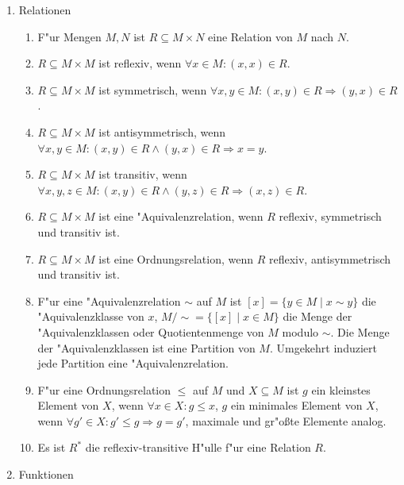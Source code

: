 \begin{enumerate}
\begin{enumerate}
    \item DeMorgan: $A\setminus (B\cup C) \Leftrightarrow (A\setminus B) \cap (A\setminus C)$
    \item DeMorgan: $A\setminus (B\cap C) \Leftrightarrow (A\setminus B) \cup (A\setminus C)$
    \item Es ist $\bigcup_{i\in I}A_i = \{x\mid \exists i\in I: x\in A_i\}$.
    \item Es ist $\bigcap_{i\in I}A_i = \{x\mid\forall i\in I: x\in A_i\}$.
\end{enumerate}
\item Relationen
\begin{enumerate}
    \item F"ur Mengen $M,N$ ist $R\subseteq M\times N$ eine Relation von $M$ nach $N$.
    \item $R\subseteq M\times M$ ist reflexiv, wenn $\forall x\in M: (x,x)\in R$.
    \item $R\subseteq M\times M$ ist symmetrisch, wenn $\forall x,y\in M: (x,y)\in R \Rightarrow (y,x)\in R$.
    \item $R\subseteq M\times M$ ist antisymmetrisch, wenn $\forall x,y\in M: (x,y)\in R \wedge (y,x)\in R \Rightarrow x=y$.
    \item $R\subseteq M\times M$ ist transitiv, wenn $\forall x,y,z\in M: (x,y)\in R \wedge (y,z)\in R \Rightarrow (x,z)\in R$.
    \item $R\subseteq M\times M$ ist eine "Aquivalenzrelation, wenn $R$ reflexiv, symmetrisch und transitiv ist.
    \item $R\subseteq M\times M$ ist eine Ordnungsrelation, wenn $R$ reflexiv, antisymmetrisch und transitiv ist.
    \item F"ur eine "Aquivalenzrelation $\sim$ auf $M$ ist $[x]=\{y\in M\mid x\sim y\}$ die "Aquivalenzklasse von $x$, $M/\sim = \{[x]\mid x\in M\}$ die Menge der "Aquivalenzklassen oder Quotientenmenge von $M$ modulo $\sim$. Die Menge der "Aquivalenzklassen ist eine Partition von $M$. Umgekehrt induziert jede Partition eine "Aquivalenzrelation.
    \item F"ur eine Ordnungsrelation $\leq$ auf $M$ und $X\subseteq M$ ist $g$ ein kleinstes Element von $X$, wenn $\forall x\in X: g\leq x$, $g$ ein minimales Element von $X$, wenn $\forall g'\in X: g'\leq g\Rightarrow g=g'$, maximale und gr"o{\ss}te Elemente analog.
    \item Es ist $R^*$ die reflexiv-transitive H"ulle f"ur eine Relation $R$.
\end{enumerate}
\item Funktionen

\end{enumerate}
